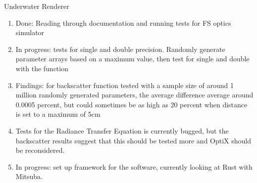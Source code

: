 \begin{frame}{Underwater Renderer}
    \begin{enumerate}
	    \item Done: Reading through documentation and running tests for FS optics simulator
	    \item In progress: tests for single and double precision. Randomly generate parameter arrays based on a maximum value, then test for single and double with the function
     	    \item Findings: for backscatter function tested with a sample size of around 1 million randomly generated parameters, the average difference average around 0.0005 percent, but could sometimes be as high as 20 percent when distance is set to a maximum of 5cm
	    \item Tests for the Radiance Transfer Equation is currently bugged, but the backscatter results suggest that this should be tested more and OptiX should be reconsidered.
	    \item In progress: set up framework for the software, currently looking at Rust with Mitsuba.
    \end{enumerate}
\end{frame}

